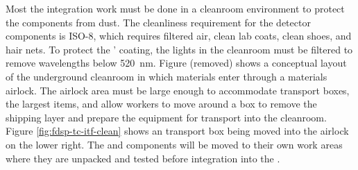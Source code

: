 Most the integration work must be done in a cleanroom environment to protect the components from dust. The cleanliness requirement for the detector components is ISO-8, which requires  filtered air, clean lab coats, clean shoes, and hair nets. To protect the '  coating, the lights in the cleanroom must be filtered to remove wavelengths below \SI{520}{nm}\cite{LBNE-docdb-8348}.  Figure (removed) shows a conceptual layout of the underground cleanroom in which materials enter through a materials airlock. The airlock area  must be large enough to accommodate  transport boxes, the largest items, and allow workers to move around a box to remove the shipping layer and prepare the equipment for transport into the cleanroom.  Figure \ref{fig:fdsp-tc-itf-clean} shows an  transport box being moved into the airlock on the lower right. The  and  components will be moved to their own work areas where they are unpacked and tested before integration into the . 


